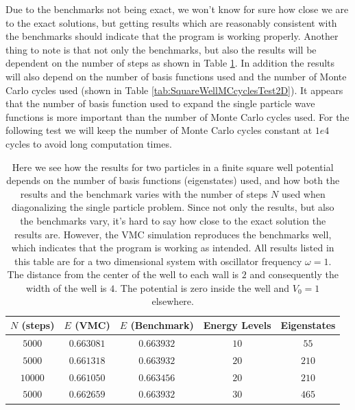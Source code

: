 \documentclass[../main.tex]{subfiles}
\begin{document}
Due to the benchmarks not being exact, we won't know for sure how close we are to the exact solutions, but getting results which are reasonably consistent with the benchmarks should indicate that the program is working properly. Another thing to note is that not only the benchmarks, but also the results will be dependent on the number of steps as shown in Table \ref{tab:SquareWellPreTest2D}. In addition the results will also depend on the number of basis functions used and the number of Monte Carlo cycles used (shown in Table \ref{tab:SquareWellMCcyclesTest2D}). It appears that the number of basis function used to expand the single particle wave functions is more important than the number of Monte Carlo cycles used. For the following test we will keep the number of Monte Carlo cycles constant at $1e4$ cycles to avoid long computation times.

\begin{table}[!ht]
  \centering
  \begin{tabular}{ | c | c | c | c | c | }
    \hline
    $N$ (steps) & $E$ (VMC) & $E$ (Benchmark) &  Energy Levels & Eigenstates\\*
    \hline
    $5000$ & $0.663081$ & $0.663932$ & $10$ & $55$ \\*
    \hline
    $5000$ & $0.661318$ & $0.663932$ & $20$ & $210$ \\*
    \hline
    $10000$ & $0.661050$ & $0.663456$ & $20$ & $210$ \\*
    \hline
    $5000$ & $0.662659$ & $0.663932$ & $30$ & $465$ \\*
    \hline
  \end{tabular}
  \caption{Here we see how the results for two particles in a finite square well potential depends on the number of basis functions (eigenstates) used, and how both the results and the benchmark varies with the number of steps $N$ used when diagonalizing the single particle problem. Since not only the results, but also the benchmarks vary, it's hard to say how close to the exact solution the results are. However, the VMC simulation reproduces the benchmarks well, which indicates that the program is working as intended. All results listed in this table are for a two dimensional system with oscillator frequency $\omega = 1$. The distance from the center of the well to each wall is $2$ and consequently the width of the well is $4$. The potential is zero inside the well and $V_0 = 1$ elsewhere.}
  \label{tab:SquareWellPreTest2D}
\end{table}
\end{document}
